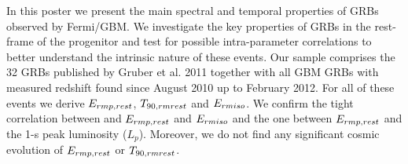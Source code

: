 


\bigskip



\bigskip

\noindent In this poster we present the main spectral and temporal properties of GRBs observed by Fermi/GBM. We investigate the key properties of GRBs in the rest-frame of the progenitor and test for possible intra-parameter correlations to better understand the intrinsic nature of these events.
Our sample comprises the 32 GRBs published by Gruber et al. 2011 together with all GBM GRBs with measured redshift found since August 2010 up to February 2012. For all of these events we derive $E_{\\rm p,rest}$, $T_{90,{\\rm rest}}$ and $E_{\\rm iso}$. We confirm the tight correlation between and $E_{\\rm p,rest}$ and $E_{\\rm iso}$ and the one between $E_{\\rm p,rest}$ and the 1-s peak luminosity ($L_p$). Moreover, we do not find any significant cosmic evolution of $E_{\\rm p,rest}$ or $T_{90,{\\rm rest}}$.

